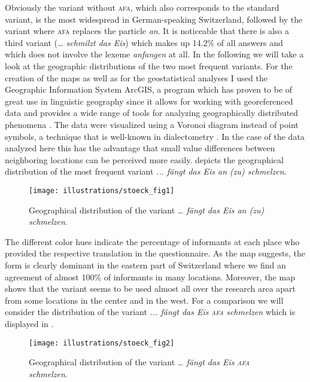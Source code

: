 \documentclass[output=paper]{LSP/langsci}
\begin{document}
Obviously the variant without \textsc{afa}, which also corresponds to the standard variant, is the most widespread in German-speaking Switzerland, followed by the variant where \textsc{afa }replaces the particle \emph{an}. It is noticeable that there is also a third variant (\emph{… schmilzt das Eis}) which makes up 14.2\% of all answers and which does not involve the lexeme \emph{anfangen} at all. In the following we will take a look at the geographic distributions of the two most frequent variants. For the creation of the maps as well as for the geostatistical analyses I used the Geographic Information System ArcGIS, a program which has proven to be of great use in linguistic geography since it allows for working with georeferenced data and provides a wide range of tools for analyzing geographically distributed phenomena \citep{montgomery_geographic_2013,stoeckle_subjektive_2014}. The data were visualized using a Voronoi diagram instead of point symbols, a technique that is well-known in dialectometry \citep{goebl_dialectometry_2010,nerbonne_mapping_2010}. In the case of the data analyzed here this has the advantage that small value differences between neighboring locations can be perceived more easily.  depicts the geographical distribution of the most frequent variant \emph{... fängt das Eis an (zu) schmelzen}.

\begin{figure}
\texttt{[image: illustrations/stoeck\_fig1]}
\caption{Geographical distribution of the variant \emph{… fängt das Eis an (zu) schmelzen}.}
\label{fig:stoeck:1}
\end{figure}

The different color hues indicate the percentage of informants at each place who provided the respective translation in the questionnaire. As the map suggests, the form is clearly dominant in the eastern part of Switzerland where we find an agreement of almost 100\% of informants in many locations. Moreover, the map shows that the variant seems to be used almost all over the research area apart from some locations in the center and in the west. For a comparison we will consider the distribution of the variant \emph{... fängt das Eis }\emph{\textsc{afa}}\emph{ schmelzen} which is displayed in .

  
\begin{figure}
\texttt{[image: illustrations/stoeck\_fig2]}
\caption{Geographical distribution of the variant \emph{… fängt das Eis \textsc{afa} schmelzen}.}
\label{fig:stoeck:2}
\end{figure}
 
\end{document}
